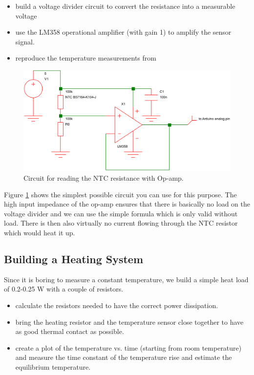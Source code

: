 \begin{itemize}
	\item build a voltage divider circuit to convert the resistance into a measurable voltage
	\item use the LM358 operational amplifier (with gain 1) to amplify the sensor signal.
	\item reproduce the temperature measurements from 
\end{itemize}

\begin{figure}[H]
\begin{center}
\includegraphics[width=14cm]{ntc_opamp_schematic}
\caption{Circuit for reading the NTC resistance with Op-amp.}\label{fig:tempcircuit}
\end{center}
\end{figure}

Figure \ref{fig:tempcircuit} shows the simplest possible circuit you can use for this purpose. The high input impedance of the op-amp ensures that there is basically no load on the voltage divider and we can use the simple formula which is only valid without load. There is then also virtually no current flowing through the NTC resistor which would heat it up.



\subsection{Building a Heating System}\label{sec:heat}
Since it is boring to measure a constant temperature, we build a simple heat load of 0.2-0.25 W with a couple of resistors.
\begin{itemize}
	\item calculate the resistors needed to have the correct power dissipation.
	\item bring the heating resistor and the temperature sensor close together to have as good thermal contact as possible.
	\item create a plot of the temperature vs. time (starting from room temperature) and measure the time constant of the temperature rise and estimate the equilibrium temperature.
\end{itemize}

